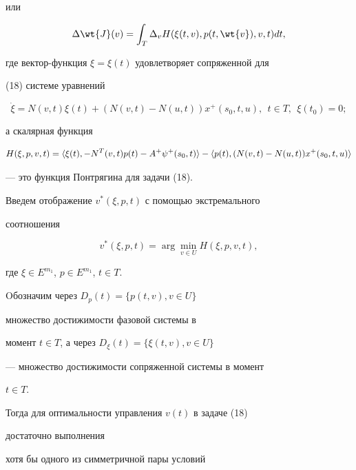 или


\begin{equation}


\Delta \wt{J}(v)=\int_T\Delta_v H(\xi(t,v),p(t,\wt{v}),v,t)dt,


\label{dJv2}


\end{equation}


где вектор-функция $\xi=\xi(t)$ удовлетворяет сопряженной для


(18) системе уравнений


$$


\Dot{\xi}=N(v,t)\xi(t)+(N(v,t)-N(u,t))x^+(s_0,t,u),\ \ t\in T, 


\ \ \xi(t_0)=0;


$$


а скалярная функция 


$$


H(\xi,p,v,t)=\la \xi(t),-N^T(v,t)p(t)-A^+\psi^+(s_0,t)\ra -


\la p(t),(N(v,t)-N(u,t))x^+(s_0,t,u)\ra


$$


--- это функция Понтрягина для задачи (18).





Введем отображение $v^*(\xi,p,t)$ с помощью экстремального


соотношения


\begin{equation}


v^*(\xi,p,t)=\arg\min\limits_{v\in U} H(\xi,p,v,t),


\label{ham}


\end{equation}


где $\xi\in E^{m_1}$, $p\in E^{m_1}$, $t\in T$.


Oбозначим через $D_p(t)=\{p(t,v),v\in U\}$


множество достижимости фазовой системы в


момент $t\in T$, а через $D_{\xi}(t)=\{\xi (t,v),v\in U\}$


--- множество достижимости сопряженной системы в момент


$t\in T$.





Тогда для оптимальности управления $v(t)$ в задаче (18)


достаточно выполнения


хотя бы одного из симметричной пары условий


